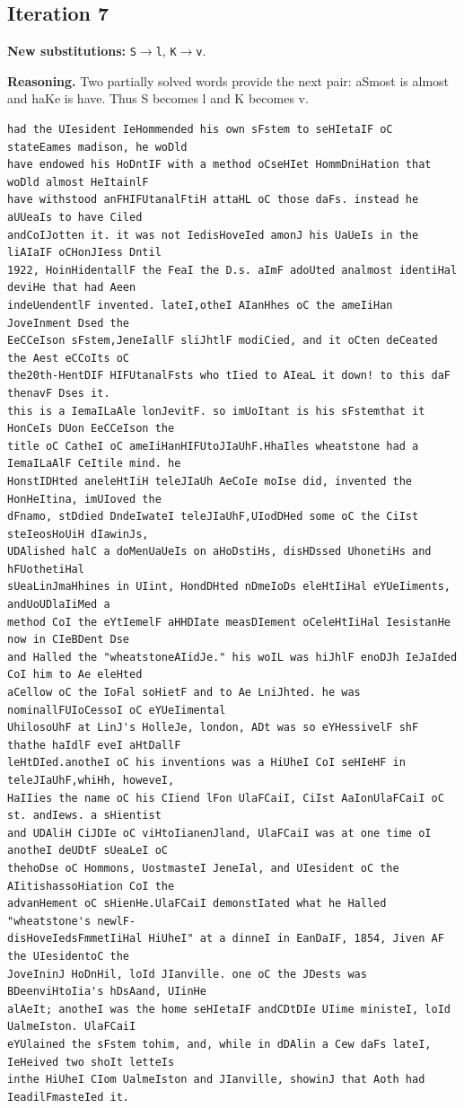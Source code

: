 \documentclass[12pt,a4paper]{article}
\begin{document}
\subsection{Iteration 7}

\noindent\textbf{New substitutions:} \texttt{S}$\rightarrow$\texttt{l}, \texttt{K}$\rightarrow$\texttt{v}.\par
\smallskip
\noindent\textbf{Reasoning.} Two partially solved words provide the next pair: aSmost is almost and haKe is have. Thus S becomes l and K becomes v.

\begin{lstlisting}[style=ciphertext,caption={Complete text after iteration 7}]
had the UIesident IeHommended his own sFstem to seHIetaIF oC stateEames madison, he woDld
have endowed his HoDntIF with a method oCseHIet HommDniHation that woDld almost HeItainlF
have withstood anFHIFUtanalFtiH attaHL oC those daFs. instead he aUUeaIs to have Ciled
andCoIJotten it. it was not IedisHoveIed amonJ his UaUeIs in the liAIaIF oCHonJIess Dntil
1922, HoinHidentallF the FeaI the D.s. aImF adoUted analmost identiHal deviHe that had Aeen
indeUendentlF invented. lateI,otheI AIanHhes oC the ameIiHan JoveInment Dsed the
EeCCeIson sFstem,JeneIallF sliJhtlF modiCied, and it oCten deCeated the Aest eCCoIts oC
the20th-HentDIF HIFUtanalFsts who tIied to AIeaL it down! to this daF thenavF Dses it.
this is a IemaILaAle lonJevitF. so imUoItant is his sFstemthat it HonCeIs DUon EeCCeIson the
title oC CatheI oC ameIiHanHIFUtoJIaUhF.HhaIles wheatstone had a IemaILaAlF CeItile mind. he
HonstIDHted aneleHtIiH teleJIaUh AeCoIe moIse did, invented the HonHeItina, imUIoved the
dFnamo, stDdied DndeIwateI teleJIaUhF,UIodDHed some oC the CiIst steIeosHoUiH dIawinJs,
UDAlished halC a doMenUaUeIs on aHoDstiHs, disHDssed UhonetiHs and hFUothetiHal
sUeaLinJmaHhines in UIint, HondDHted nDmeIoDs eleHtIiHal eYUeIiments, andUoUDlaIiMed a
method CoI the eYtIemelF aHHDIate measDIement oCeleHtIiHal IesistanHe now in CIeBDent Dse
and Halled the "wheatstoneAIidJe." his woIL was hiJhlF enoDJh IeJaIded CoI him to Ae eleHted
aCellow oC the IoFal soHietF and to Ae LniJhted. he was nominallFUIoCessoI oC eYUeIimental
UhilosoUhF at LinJ's HolleJe, london, ADt was so eYHessivelF shF thathe haIdlF eveI aHtDallF
leHtDIed.anotheI oC his inventions was a HiUheI CoI seHIeHF in teleJIaUhF,whiHh, howeveI,
HaIIies the name oC his CIiend lFon UlaFCaiI, CiIst AaIonUlaFCaiI oC st. andIews. a sHientist
and UDAliH CiJDIe oC viHtoIianenJland, UlaFCaiI was at one time oI anotheI deUDtF sUeaLeI oC
thehoDse oC Hommons, UostmasteI JeneIal, and UIesident oC the AIitishassoHiation CoI the
advanHement oC sHienHe.UlaFCaiI demonstIated what he Halled "wheatstone's newlF-
disHoveIedsFmmetIiHal HiUheI" at a dinneI in EanDaIF, 1854, Jiven AF the UIesidentoC the
JoveIninJ HoDnHil, loId JIanville. one oC the JDests was BDeenviHtoIia's hDsAand, UIinHe
alAeIt; anotheI was the home seHIetaIF andCDtDIe UIime ministeI, loId UalmeIston. UlaFCaiI
eYUlained the sFstem tohim, and, while in dDAlin a Cew daFs lateI, IeHeived two shoIt letteIs
inthe HiUheI CIom UalmeIston and JIanville, showinJ that Aoth had IeadilFmasteIed it.
\end{lstlisting}
\end{document}
